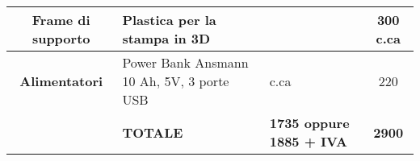 \begin{table*}
\begin{tabular}{c  L{0.3\textwidth}  L{0.2\textwidth}  c }
\textbf{Frame di supporto} & Plastica per la stampa in 3D &  & 300 c.ca \\ \midrule
\textbf{Alimentatori} & Power Bank Ansmann 10 Ah, 5V, 3 porte USB &  c.ca & 220 \\ \midrule

&\textbf{TOTALE} & \textbf{ 1735 oppure 1885 + IVA} & \textbf{2900} \\ \bottomrule 
                                            
                                                


\end{tabular}
\end{table*}



